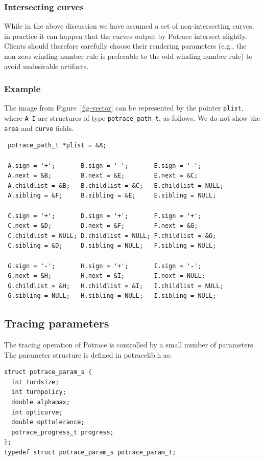 \documentclass{article}
\begin{document}
\subsubsection{Intersecting curves}

While in the above discussion we have assumed a set of
non-intersecting curves, in practice it can happen that the curves
output by Potrace intersect slightly. Clients should therefore
carefully choose their rendering parameters (e.g., the non-zero
winding number rule is preferable to the odd winding number rule) to
avoid undesirable artifacts.

\subsubsection{Example}

The image from Figure~\ref{fig-vector} can be represented by the
pointer \verb!plist!, where {\tt A}--{\tt I} are structures
of type \verb!potrace_path_t!, as follows.  We do not show the
\verb!area! and \verb!curve! fields.
{\small
\begin{verbatim}
 potrace_path_t *plist = &A;

 A.sign = '+';       B.sign = '-';       E.sign = '-';
 A.next = &B;        B.next = &E;        E.next = &C;
 A.childlist = &B;   B.childlist = &C;   E.childlist = NULL;
 A.sibling = &F;     B.sibling = &E;     E.sibling = NULL;

 C.sign = '+';       D.sign = '+';       F.sign = '+';
 C.next = &D;        D.next = &F;        F.next = &G;
 C.childlist = NULL; D.childlist = NULL; F.childlist = &G;
 C.sibling = &D;     D.sibling = NULL;   F.sibling = NULL;

 G.sign = '-';       H.sign = '+';       I.sign = '-';
 G.next = &H;        H.next = &I;        I.next = NULL;
 G.childlist = &H;   H.childlist = &I;   I.childlist = NULL;
 G.sibling = NULL;   H.sibling = NULL;   I.sibling = NULL;
\end{verbatim}
}

\subsection{Tracing parameters}\label{ssec-parameters}

The tracing operation of Potrace is controlled by a small number of
parameters. The parameter structure is defined in potracelib.h as:

\begin{verbatim}
struct potrace_param_s {
  int turdsize;        
  int turnpolicy;      
  double alphamax;     
  int opticurve;       
  double opttolerance; 
  potrace_progress_t progress; 
};
typedef struct potrace_param_s potrace_param_t;
\end{verbatim}
\end{document}

